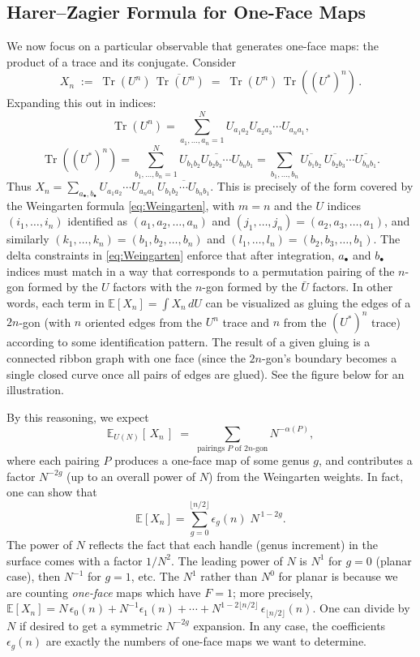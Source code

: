 \documentclass[letterpaper,11pt,oneside,reqno]{article}
\numberwithin{equation}{section}
\theoremstyle{definition}
\begin{document}
\subsection*{Harer–Zagier Formula for One-Face Maps}

We now focus on a particular observable that generates one-face maps: the product of a trace and its conjugate. Consider
\[ X_n \;:=\; \operatorname{Tr}(U^n)\,\overline{\operatorname{Tr}(U^n)} \;=\; \operatorname{Tr}(U^n)\,\operatorname{Tr}((U^*)^n)\,. \]
Expanding this out in indices:
\[ \operatorname{Tr}(U^n) = \sum_{a_1,\dots,a_n=1}^N U_{a_1 a_2} U_{a_2 a_3}\cdots U_{a_n a_1}, \]
\[ \operatorname{Tr}((U^*)^n) = \sum_{b_1,\dots,b_n=1}^N \overline{U_{b_1 b_2} U_{b_2 b_3}\cdots U_{b_n b_1}} = \sum_{b_1,\dots,b_n} \overline{U_{b_1 b_2}}\,\overline{U_{b_2 b_3}}\cdots \overline{U_{b_n b_1}}. \]
Thus $X_n = \sum_{a_\bullet,b_\bullet} U_{a_1 a_2}\cdots U_{a_n a_1}\,\overline{U_{b_1 b_2}\cdots U_{b_n b_1}}$. This is precisely of the form covered by the Weingarten formula \eqref{eq:Weingarten}, with $m=n$ and the $U$ indices $(i_1,\dots,i_n)$ identified as $(a_1,a_2,\dots,a_n)$ and $(j_1,\dots,j_n)=(a_2,a_3,\dots,a_1)$, and similarly $(k_1,\dots,k_n)=(b_1,b_2,\dots,b_n)$ and $(l_1,\dots,l_n)=(b_2,b_3,\dots,b_1)$. The delta constraints in \eqref{eq:Weingarten} enforce that after integration, $a_\bullet$ and $b_\bullet$ indices must match in a way that corresponds to a permutation pairing of the $n$-gon formed by the $U$ factors with the $n$-gon formed by the $\bar U$ factors. In other words, each term in $\mathbb{E}[X_n] = \int X_n\,dU$ can be visualized as gluing the edges of a $2n$-gon (with $n$ oriented edges from the $U^n$ trace and $n$ from the $(U^*)^n$ trace) according to some identification pattern. The result of a given gluing is a connected ribbon graph with one face (since the $2n$-gon's boundary becomes a single closed curve once all pairs of edges are glued). See the figure below for an illustration.

By this reasoning, we expect
\[ \mathbb{E}_{U(N)}[\,X_n\,] \;=\; \sum_{\text{pairings }P \text{ of }2n\text{-gon}} N^{-\alpha(P)}, \]
where each pairing $P$ produces a one-face map of some genus $g$, and contributes a factor $N^{-2g}$ (up to an overall power of $N$) from the Weingarten weights. In fact, one can show that
\[ \mathbb{E}[X_n] = \sum_{g=0}^{\lfloor n/2\rfloor} \epsilon_g(n)\; N^{\,1-2g}. \]
The power of $N$ reflects the fact that each handle (genus increment) in the surface comes with a factor $1/N^2$. The leading power of $N$ is $N^1$ for $g=0$ (planar case), then $N^{-1}$ for $g=1$, etc. The $N^1$ rather than $N^0$ for planar is because we are counting \emph{one-face} maps which have $F=1$; more precisely, $\mathbb{E}[X_n] = N\,\epsilon_0(n) + N^{-1}\epsilon_1(n) + \cdots + N^{1-2\lfloor n/2\rfloor}\,\epsilon_{\lfloor n/2\rfloor}(n)$. One can divide by $N$ if desired to get a symmetric $N^{ -2g}$ expansion. In any case, the coefficients $\epsilon_g(n)$ are exactly the numbers of one-face maps we want to determine.
\end{document}
